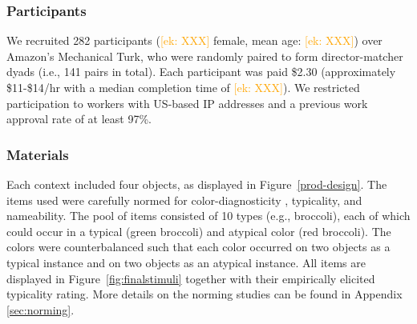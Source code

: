 \documentclass[a4paper,man,floatsintext,natbib]{apa6}
\newcommand{\ek}[1]{\textcolor{Orange}{[ek: #1]}}
\newcommand{\figref}[1]{Figure~\ref{#1}}
\newcommand{\appref}[1]{Appendix \ref{#1}}
\begin{document}
\subsubsection{Participants}

We recruited 282 participants (\ek{XXX} female, mean age: \ek{XXX}) over Amazon's Mechanical Turk, who were randomly paired to form director-matcher dyads (i.e., 141 pairs in total). Each participant was paid \$2.30 (approximately \$11-\$14/hr with a median completion time of \ek{XXX}). We restricted participation to workers with US-based IP addresses and a previous work approval rate of at least 97\%.


\subsubsection{Materials}

Each context included four objects, as displayed in \figref{prod-design}. The items used were carefully normed for color-diagnosticity \cite{Tanaka:1999}, typicality, and nameability. 
The pool of items consisted of 10 types (e.g., broccoli), each of which could occur in a typical (green broccoli) and atypical color (red broccoli). The colors were counterbalanced such that each color occurred on two objects as a typical instance and on two objects as an atypical instance. All items are displayed in \figref{fig:finalstimuli} together with their empirically elicited typicality rating. More details on the norming studies can be found in \appref{sec:norming}.
\end{document}
